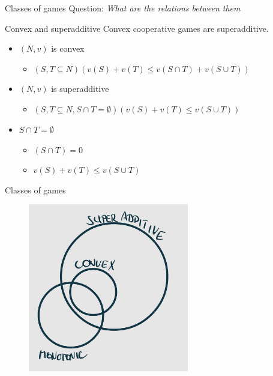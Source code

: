 \documentclass{beamer}
\begin{document}


\begin{frame}{Classes of games}
    Question: \textit{What are the relations between them}
	\begin{block}{Convex and superadditive}
		Convex cooperative games are superadditive.
	\end{block}
	\begin{itemize}
		\item<2-> $(N,v)$ is convex
		\begin{itemize}
			\item<2-> $\left(S,T \subseteq N\right)\left(v(S)+v(T) \leq v\left(S \cap T\right)+v\left(S \cup T\right)\right)$
		\end{itemize}
		\item<3-> $(N,v)$ is superadditive
		\begin{itemize}
			\item<3-> $\left(S,T \subseteq N, S \cap T = \emptyset\right)\left(v(S)+v(T) \leq v\left(S \cup T\right)\right)$
		\end{itemize}
		\item<4-> $S \cap T = \emptyset$
		\begin{itemize}
			\item<4-> $\left(S \cap T\right) = 0$
			\item<4-> $v(S)+v(T) \leq v\left(S \cup T\right)$
		\end{itemize}
	\end{itemize}
\end{frame}



\begin{frame}{Classes of games}
	\begin{figure}
		\centering
		\includegraphics[width=7cm]{Images/classes_of_games.jpg}
	\end{figure}
\end{frame}
\end{document}
